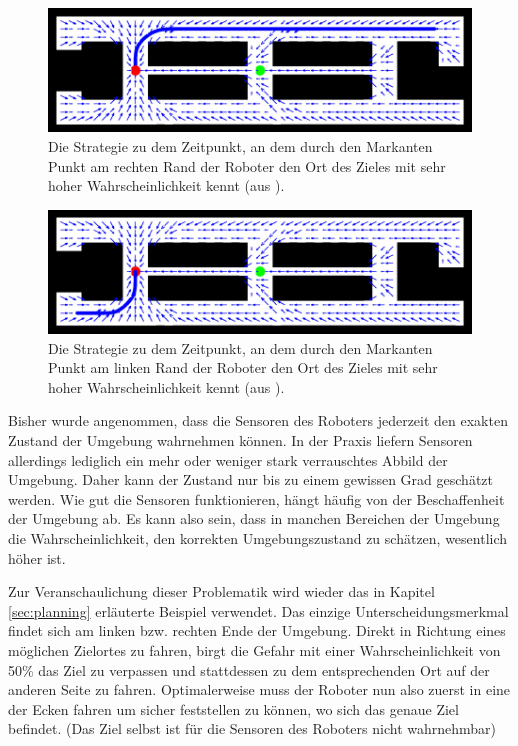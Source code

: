 \documentclass[a4paper]{IEEEtran}
\begin{document}
\begin{figure}[ht]
	\centering
	\includegraphics[scale=0.72]{images/autnmRobot_POMDPPathB.png}
	\caption{Die Strategie zu dem Zeitpunkt, an dem durch den Markanten Punkt am rechten Rand der Roboter den Ort des Zieles mit sehr hoher Wahrscheinlichkeit kennt (aus \cite{thrun2005probabilistic}).}
	\label{autnmRobot_POMDPPathB}
\end{figure}

\begin{figure}[ht]
	\centering
	\includegraphics[scale=0.72]{images/autnmRobot_POMDPPathC.png}
	\caption{Die Strategie zu dem Zeitpunkt, an dem durch den Markanten Punkt am linken Rand der Roboter den Ort des Zieles mit sehr hoher Wahrscheinlichkeit kennt (aus \cite{thrun2005probabilistic}).}
	\label{autnmRobot_POMDPPathC}
\end{figure}

Bisher wurde angenommen, dass die Sensoren des Roboters jederzeit den exakten Zustand der Umgebung wahrnehmen können. In der Praxis liefern Sensoren allerdings lediglich ein mehr oder weniger stark verrauschtes Abbild der Umgebung. Daher kann der Zustand nur bis zu einem gewissen Grad geschätzt werden. Wie gut die Sensoren funktionieren, hängt häufig von der Beschaffenheit der Umgebung ab. Es kann also sein, dass in manchen Bereichen der Umgebung die Wahrscheinlichkeit, den korrekten Umgebungszustand zu schätzen, wesentlich höher ist.

Zur Veranschaulichung dieser Problematik wird wieder das in Kapitel \ref{sec:planning} erläuterte Beispiel verwendet. Das einzige Unterscheidungsmerkmal findet sich am linken bzw. rechten Ende der Umgebung. Direkt in Richtung eines möglichen Zielortes zu fahren, birgt die Gefahr mit einer Wahrscheinlichkeit von 50\% das Ziel zu verpassen und stattdessen zu dem entsprechenden Ort auf der anderen Seite zu fahren. Optimalerweise muss der Roboter nun also zuerst in eine der Ecken fahren um sicher feststellen zu können, wo sich das genaue Ziel befindet. (Das Ziel selbst ist für die Sensoren des Roboters nicht wahrnehmbar)
\end{document}
